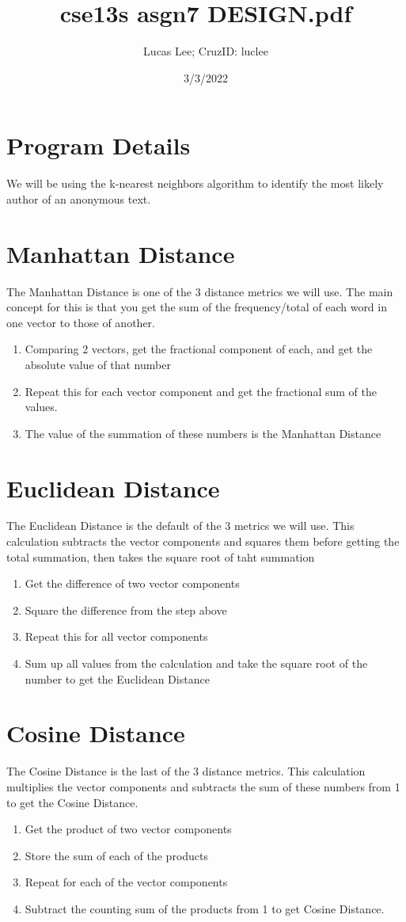 \documentclass[11pt]{article}
\title{cse13s asgn7 DESIGN.pdf}
\author{Lucas Lee; CruzID: luclee}
\date{3/3/2022}
\begin{document}
\maketitle
\section{Program Details}\label{ss:details}
We will be using the k-nearest neighbors algorithm to identify the most likely author of an anonymous text.
\section{Manhattan Distance}\label{ss:manhattan}
The Manhattan Distance is one of the 3 distance metrics we will use. The main concept for this is that you get the sum of the frequency/total of each word in one vector to those of another.
\begin{enumerate}
\item Comparing 2 vectors, get the fractional component of each, and get the absolute value of that number
\item Repeat this for each vector component and get the fractional sum of the values.
\item The value of the summation of these numbers is the Manhattan Distance
\end{enumerate}

\section{Euclidean Distance}\label{ss:euclidean}
The Euclidean Distance is the default of the 3 metrics we will use. This calculation subtracts the vector components and squares them before getting the total summation, then takes the square root of taht summation
\begin{enumerate}
\item Get the difference of two vector components
\item Square the difference from the step above
\item Repeat this for all vector components
\item Sum up all values from the calculation and take the square root of the number to get the Euclidean Distance
\end{enumerate}

\section{Cosine Distance}\label{ss:Cosine}
The Cosine Distance is the last of the 3 distance metrics. This calculation multiplies the vector components and subtracts the sum of these numbers from 1 to get the Cosine Distance.
\begin{enumerate}
\item Get the product of two vector components
\item Store the sum of each of the products
\item Repeat for each of the vector components
\item Subtract the counting sum of the products from 1 to get Cosine Distance.
\end{enumerate}
\end{document}
